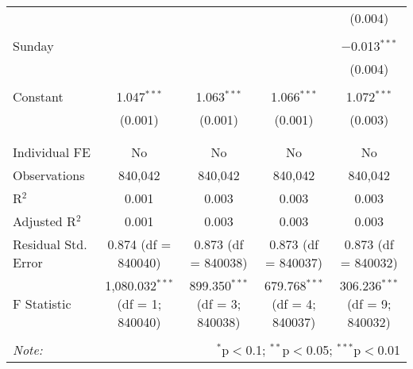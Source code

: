 \documentclass[
]{article}
\begin{document}
\begin{table}[!htbp]
{\begin{tabular}{@{\extracolsep{5pt}}lcccc}
  &  &  &  & (0.004) \\ 
  & & & & \\ 
 Sunday &  &  &  & $-$0.013$^{***}$ \\ 
  &  &  &  & (0.004) \\ 
  & & & & \\ 
 Constant & 1.047$^{***}$ & 1.063$^{***}$ & 1.066$^{***}$ & 1.072$^{***}$ \\ 
  & (0.001) & (0.001) & (0.001) & (0.003) \\ 
  & & & & \\ 
\hline \\[-1.8ex] 
Individual FE & No & No & No & No \\ 
Observations & 840,042 & 840,042 & 840,042 & 840,042 \\ 
R$^{2}$ & 0.001 & 0.003 & 0.003 & 0.003 \\ 
Adjusted R$^{2}$ & 0.001 & 0.003 & 0.003 & 0.003 \\ 
Residual Std. Error & 0.874 (df = 840040) & 0.873 (df = 840038) & 0.873 (df = 840037) & 0.873 (df = 840032) \\ 
F Statistic & 1,080.032$^{***}$ (df = 1; 840040) & 899.350$^{***}$ (df = 3; 840038) & 679.768$^{***}$ (df = 4; 840037) & 306.236$^{***}$ (df = 9; 840032) \\ 
\hline 
\hline \\[-1.8ex] 
\textit{Note:}  & \multicolumn{4}{r}{$^{*}$p$<$0.1; $^{**}$p$<$0.05; $^{***}$p$<$0.01} \\ 
\end{tabular}
} 
\end{table} 
\newpage
\end{document}
